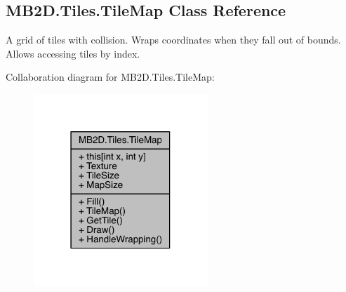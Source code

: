 \hypertarget{class_m_b2_d_1_1_tiles_1_1_tile_map}{}\subsection{M\+B2\+D.\+Tiles.\+Tile\+Map Class Reference}
\label{class_m_b2_d_1_1_tiles_1_1_tile_map}


A grid of tiles with collision. Wraps coordinates when they fall out of bounds. Allows accessing tiles by index.  




Collaboration diagram for M\+B2\+D.\+Tiles.\+Tile\+Map\+:
\nopagebreak
\begin{figure}[H]
\begin{center}
\leavevmode
\includegraphics[width=186pt]{class_m_b2_d_1_1_tiles_1_1_tile_map__coll__graph}
\end{center}
\end{figure}
